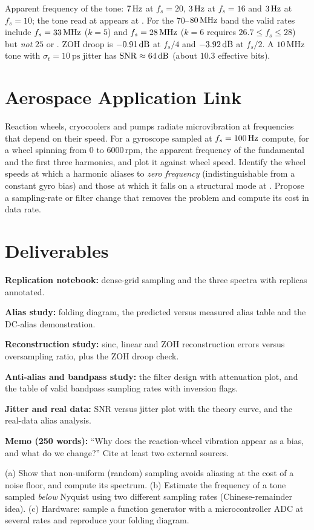 \documentclass[11pt,a4paper]{article}
\begin{document}
\begin{checkpoint}
Apparent frequency of the  tone: $\SI{7}{\hertz}$ at $f_s=20$, $\SI{3}{\hertz}$ at $f_s=16$ and $\SI{3}{\hertz}$ at $f_s=10$; the  tone read at  appears at . For the $70$--$\SI{80}{\mega\hertz}$ band the valid rates include $f_s=\SI{33}{\mega\hertz}$ ($k=5$) and $f_s=\SI{28}{\mega\hertz}$ ($k=6$ requires $26.7\le f_s\le28$) but \emph{not} $25$ or . ZOH droop is $\dB{-0.91}$ at $f_s/4$ and $\dB{-3.92}$ at $f_s/2$. A $10$\,MHz tone with $\sigma_t=\SI{10}{\pico\second}$ jitter has $\mathrm{SNR}\approx\dB{64}$ (about $10.3$ effective bits).
\end{checkpoint}

\section*{Aerospace Application Link}
Reaction wheels, cryocoolers and pumps radiate microvibration at frequencies that depend on their speed. For a gyroscope sampled at $f_s=\SI{100}{\hertz}$ compute, for a wheel spinning from 0 to $6000\,\mathrm{rpm}$, the apparent frequency of the fundamental and the first three harmonics, and plot it against wheel speed. Identify the wheel speeds at which a harmonic aliases to \emph{zero frequency} (indistinguishable from a constant gyro bias) and those at which it falls on a structural mode at . Propose a sampling-rate or filter change that removes the problem and compute its cost in data rate.

\section*{Deliverables}
\begin{delivs}
  \item[D1] \textbf{Replication notebook:} dense-grid sampling and the three spectra with replicas annotated.
  \item[D2] \textbf{Alias study:} folding diagram, the predicted versus measured alias table and the DC-alias demonstration.
  \item[D3] \textbf{Reconstruction study:} sinc, linear and ZOH reconstruction errors versus oversampling ratio, plus the ZOH droop check.
  \item[D4] \textbf{Anti-alias and bandpass study:} the filter design with attenuation plot, and the table of valid bandpass sampling rates with inversion flags.
  \item[D5] \textbf{Jitter and real data:} SNR versus jitter plot with the theory curve, and the real-data alias analysis.
  \item[D6] \textbf{Memo (250 words):} ``Why does the reaction-wheel vibration appear as a bias, and what do we change?'' Cite at least two external sources.
  \item[Bonus] (a) Show that non-uniform (random) sampling avoids aliasing at the cost of a noise floor, and compute its spectrum. (b) Estimate the frequency of a tone sampled \emph{below} Nyquist using two different sampling rates (Chinese-remainder idea). (c) Hardware: sample a function generator with a microcontroller ADC at several rates and reproduce your folding diagram.
\end{delivs}
\end{document}

